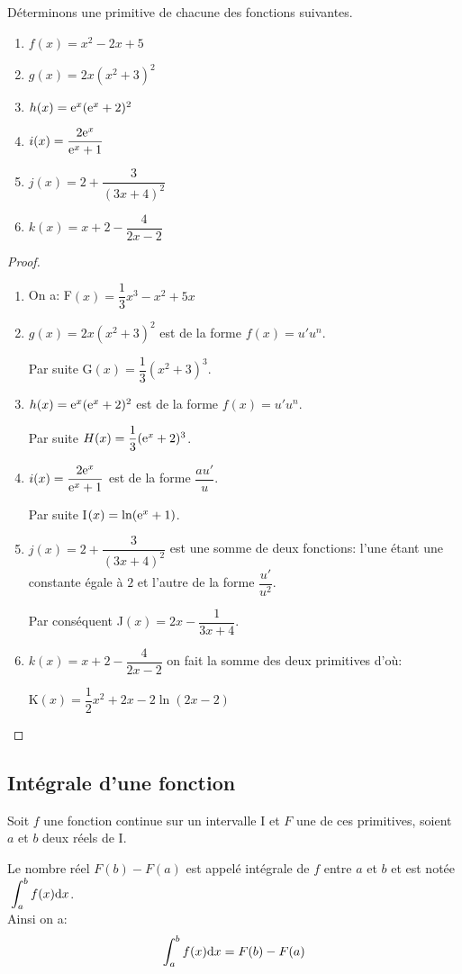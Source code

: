 \medskip 
\begin{example}

Déterminons une primitive de chacune des fonctions suivantes.
\begin{enumerate}
\item $ f(x)= x^{2}-2x+5 $
\item  $ g(x)= 2x(x^{2}+3)^{2} $
\item $ h(x)=\mathrm{e}^{x}(\mathrm{e}^{x}+2)^{2} $

\item $ i(x)=\dfrac{2\mathrm{e}^{x}}{\mathrm{e}^{x}+1} $
\item $ j(x)=2+\dfrac{3}{(3x+4)^{2}} $
\item $ k(x)= x + 2-\dfrac{4}{2x-2}$
\end{enumerate}

\end{example}
\begin{proof}
\begin{enumerate}
\item  On a:\; F$(x)= \dfrac{1}{3}x^{3}-x^{2}+5x$
\item  $ g(x)= 2x(x^{2}+3)^{2} $  est de la forme  $f(x)= u'u^{n} $.

 Par suite  G$(x)= \dfrac{1}{3}(x^{2}+3)^{3} $.
\item $ h(x)=\mathrm{e}^{x}(\mathrm{e}^{x}+2)^{2} $ est de la forme  $f(x)= u'u^{n} $.                   

Par suite $ H(x)=\dfrac{1}{3}(\mathrm{e}^{x}+2)^{3} $.
\item $ i(x)=\dfrac{2\mathrm{e}^{x}}{\mathrm{e}^{x}+1} $ est de la forme   $\dfrac{a u'}{u}$.


 Par suite   I$(x)=\ln (\mathrm{e}^{x}+1) $.

\item $ j(x)=2+\dfrac{3}{(3x+4)^{2}} $  est   une somme de deux fonctions:  l'une étant une constante égale à $ 2 $  et l'autre de la forme $ \dfrac{ u'}{u^{2}}$.

Par conséquent  J$(x)=2x-\dfrac{1}{3x+4} $.

\item $ k(x)= x + 2-\dfrac{4}{2x-2}$\;  on fait la somme des deux primitives d'où:

K$(x)= \dfrac{1}{2}x^{2} + 2x-2\ln (2x-2)$
\end{enumerate}
 \end{proof}

\subsection{Intégrale d'une fonction}
\begin{definition}
Soit $ f $ une fonction continue sur un intervalle I et $  F $ une de ces primitives, soient $ a $ et $ b $ deux réels   de I.

Le nombre réel $ F(b)-F(a) $ est appelé intégrale de $ f $ entre $ a $ et $ b $ et est notée   $\; \displaystyle\int_{a}^{b}f(x){\rm d}x $. 
\\ Ainsi on a:
$$ \displaystyle\int_{a}^{b}f(x){\rm d}x =F(b)-F(a) $$

\end{definition}

